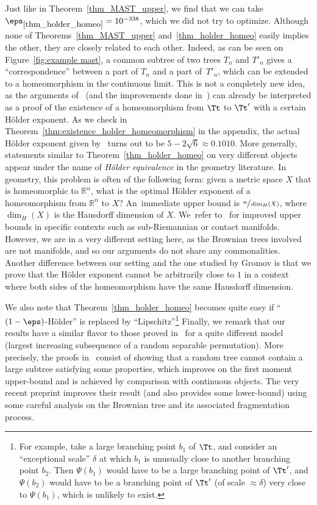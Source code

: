Just like in Theorem~\ref{thm_MAST_upper}, we find that we can take $\eps_{\ref{thm_holder_homeo}}=10^{-338}$, which we did not try to optimize.
Although none of Theorems~\ref{thm_MAST_upper} and~\ref{thm_holder_homeo} easily implies the other, they are closely related to each other.
Indeed, as can be seen on Figure~\ref{fig:example mast}, a common subtree of two trees $T_n$ and $T'_n$ gives a ``correspondence'' between a part of $T_n$ and a part of~$T'_n$, which can be extended to a homeomorphism in the continuous limit.
This is not a completely new idea, as the arguments of~\cite{aldous_largest_2022} (and the improvements done in~\cite{Khez22}) can already be interpreted as a proof of the existence of a homeomorphism from $\Tt$ to $\Tt'$ with a certain Hölder exponent.
As we check in Theorem~\ref{thm:existence_holder_homeomorphism} in the appendix, the actual Hölder exponent given by~\cite{aldous_largest_2022} turns out to be $5-2\sqrt{6}\approx 0.1010$.
More generally, statements similar to Theorem~\ref{thm_holder_homeo} on very different objects appear under the name of \emph{Hölder equivalence} in the geometry literature.
In geometry, this problem is often of the following form: given a metric space $X$ that is homeomorphic to $\mathbb{R}^n$, what is the optimal Hölder exponent of a homeomorphism from $\mathbb{R}^n$ to $X$?
An~immediate upper bound is $\sfrac{n}{\dim_H(X)}$, where $\dim_H(X)$ is the Hausdorff dimension of $X$.
We~refer to~\cite{Gromov96} for improved upper bounds in specific contexts such as sub-Riemannian or contact manifolds.
However, we are in a very different setting here, as the Brownian trees involved are not manifolds, and so our arguments do not share any commonalities.
Another difference between our setting and the one studied by Gromov is that we prove that the Hölder exponent cannot be arbitrarily close to $1$ in a context where both sides of the homeomorphism have the same Hausdorff dimension.\enlargethispage{\baselineskip}%

We also note that Theorem~\ref{thm_holder_homeo} becomes quite easy if ``$(1-\eps)$-Hölder'' is replaced by ``Lipschitz''\footnote{For example, take a large branching point $b_1$ of $\Tt$, and consider an ``exceptional scale'' $\delta$ at which $b_1$ is unusually close to another branching point $b_2$.
Then $\Psi(b_1)$ would have to be a large branching point of $\Tt'$, and $\Psi(b_2)$ would have to be a branching point of $\Tt'$ (of scale $\approx \delta$) very close to $\Psi(b_1)$, which is unlikely to exist.}
Finally, we remark that our results have a similar flavor to those proved in~\cite[Th.\,1.2, Th.\,1.7]{BBDFGMP22} for a quite different model (largest increasing subsequence of a random separable permutation). More precisely, the proofs in~\cite{BBDFGMP22} consist of showing that a random tree cannot contain a large subtree satisfying some properties, which improves on the first moment upper-bound and is achieved by comparison with continuous objects.
The very recent preprint \cite{borga_power_2023} improves their result (and also provides some lower-bound) using some careful analysis on the Brownian tree and its associated fragmentation process.

